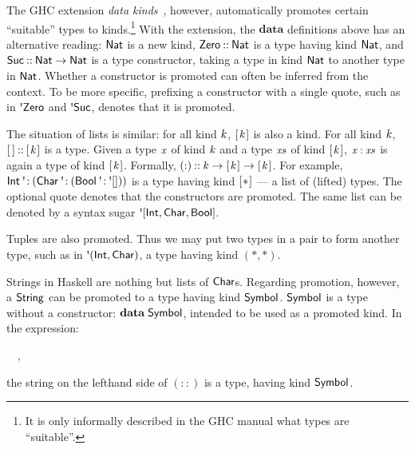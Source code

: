 The GHC extension \emph{data kinds}~\cite{promotion}, however, automatically
promotes certain ``suitable'' types to kinds.\footnote{It is only informally
described in the GHC manual what types are ``suitable''.} With the extension,
the \ensuremath{\mathbf{data}} definitions above has an alternative reading: \ensuremath{\Conid{Nat}} is a new kind,
\ensuremath{\Conid{Zero}\mathbin{::}\Conid{Nat}} is a type having kind \ensuremath{\Conid{Nat}}, and \ensuremath{\Conid{Suc}\mathbin{::}\Conid{Nat}\to \Conid{Nat}} is a type
constructor, taking a type in kind \ensuremath{\Conid{Nat}} to another type in \ensuremath{\Conid{Nat}}. Whether a
constructor is promoted can often be inferred from the context. To be more specific, prefixing a constructor with a single quote, such as in \ensuremath{\mbox{\textquotesingle}\Conid{Zero}} and
\ensuremath{\mbox{\textquotesingle}\Conid{Suc}}, denotes that it is promoted.

The situation of lists is similar: for all kind \ensuremath{\Varid{k}}, \ensuremath{[\mskip1.5mu \Varid{k}\mskip1.5mu]} is also a kind. For
all kind \ensuremath{\Varid{k}}, \ensuremath{[\mskip1.5mu \mskip1.5mu]\mathbin{::}[\mskip1.5mu \Varid{k}\mskip1.5mu]} is a type. Given a type \ensuremath{\Varid{x}}
of kind \ensuremath{\Varid{k}} and a type \ensuremath{\Varid{xs}} of kind \ensuremath{[\mskip1.5mu \Varid{k}\mskip1.5mu]}, \ensuremath{\Varid{x}\mathbin{:}\Varid{xs}} is again a type of
kind \ensuremath{[\mskip1.5mu \Varid{k}\mskip1.5mu]}. Formally, \ensuremath{(\mathbin{:})\mathbin{::}\Varid{k}\to [\mskip1.5mu \Varid{k}\mskip1.5mu]\to [\mskip1.5mu \Varid{k}\mskip1.5mu]}. For example,
\ensuremath{\Conid{Int}\mathbin{\mbox{\textquotesingle}\!:}(\Conid{Char}\mathbin{\mbox{\textquotesingle}\!:}(\Conid{Bool}\mathbin{\mbox{\textquotesingle}\!:}\mbox{\textquotesingle}[]))} is a type having kind \ensuremath{[\mskip1.5mu \mathbin{*}\mskip1.5mu]} --- a list of
(lifted) types. The optional quote denotes that the constructors are promoted.
The same list can be denoted by a syntax sugar \ensuremath{\mbox{\textquotesingle}[\Conid{Int},\Conid{Char},\Conid{Bool}]}.

Tuples are also promoted. Thus we may put two types in a pair to form another
type, such as in \ensuremath{\mbox{\textquotesingle}(\Conid{Int},\Conid{Char})}, a type having kind \ensuremath{(\mathbin{*},\mathbin{*})}.

Strings in Haskell are nothing but lists of \ensuremath{\Conid{Char}}s. Regarding promotion,
however, a \ensuremath{\Conid{String}} can be promoted to a type having kind \ensuremath{\Conid{Symbol}}. \ensuremath{\Conid{Symbol}} is
a type without a constructor: \ensuremath{\mathbf{data}\;\Conid{Symbol}},
intended to be used as a promoted kind. In the expression:
\begin{hscode}\SaveRestoreHook
{}%
%
\>[B]{}\mathbin{::}~~,{}\<[E]%
\ColumnHook
\end{hscode}\resethooks
the string on the lefthand side of \ensuremath{(\mathbin{::})} is a type, having kind \ensuremath{\Conid{Symbol}}.

